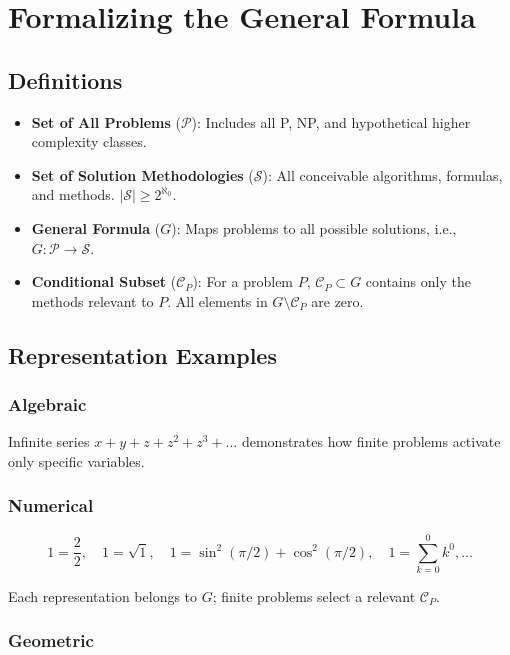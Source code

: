 \documentclass[12pt]{article}
\begin{document}
\section{Formalizing the General Formula}

\subsection{Definitions}

\begin{itemize}
    \item \textbf{Set of All Problems} ($\mathcal{P}$): Includes all P, NP, and hypothetical higher complexity classes.
    \item \textbf{Set of Solution Methodologies} ($\mathcal{S}$): All conceivable algorithms, formulas, and methods. $|\mathcal{S}| \ge 2^{\aleph_0}$.
    \item \textbf{General Formula} ($G$): Maps problems to all possible solutions, i.e., $G: \mathcal{P} \to \mathcal{S}$.
    \item \textbf{Conditional Subset} ($\mathcal{C}_P$): For a problem $P$, $\mathcal{C}_P \subset G$ contains only the methods relevant to $P$. All elements in $G \setminus \mathcal{C}_P$ are zero.
\end{itemize}

\subsection{Representation Examples}

\subsubsection{Algebraic}

Infinite series $x + y + z + z^2 + z^3 + \dots$ demonstrates how finite problems activate only specific variables.

\subsubsection{Numerical}

\[
1 = \frac{2}{2}, \quad 1 = \sqrt{1}, \quad 1 = \sin^2(\pi/2) + \cos^2(\pi/2), \quad 1 = \sum_{k=0}^{0} k^0, \dots
\]

Each representation belongs to $G$; finite problems select a relevant $\mathcal{C}_P$.

\subsubsection{Geometric}
\end{document}
